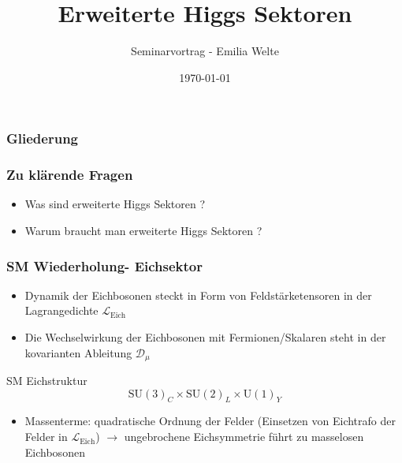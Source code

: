 \documentclass[xcolor=dvipsnames]{beamer}
\title{Erweiterte Higgs Sektoren}
\author{Seminarvortrag - Emilia Welte}
\date{ \today}
\begin{document}
\begin{frame} 
\titlepage
\end{frame}


\begin{frame}[t]
\frametitle{Gliederung}
\tableofcontents
\end{frame}

\begin{frame}
\frametitle{Zu klärende Fragen}
\begin{itemize}
\item Was sind erweiterte Higgs Sektoren ?
\item Warum braucht man erweiterte Higgs Sektoren ?
\end{itemize}
\end{frame}

\begin{frame}

\frametitle{SM Wiederholung- Eichsektor}
\begin{itemize}
\item Dynamik der Eichbosonen steckt in Form von Feldstärketensoren in der Lagrangedichte $\mathscr{L}_{\text{Eich}}$
\item Die Wechselwirkung der Eichbosonen mit Fermionen/Skalaren steht in der kovarianten Ableitung $\mathscr{D}_{\mu}$
\end{itemize}

\begin{block}{SM Eichstruktur}
\begin{equation*}
\text{SU}(3)_{C}\times \text{SU}(2)_{L} \times \text{U}(1)_{Y} 
\end{equation*}
\end{block}

\begin{itemize}
\item Massenterme: quadratische Ordnung der Felder (Einsetzen von Eichtrafo der Felder in  $\mathscr{L}_{\text{Eich}}$)   $\rightarrow$ ungebrochene Eichsymmetrie führt zu masselosen Eichbosonen
\end{itemize}

\end{frame}
\end{document}
